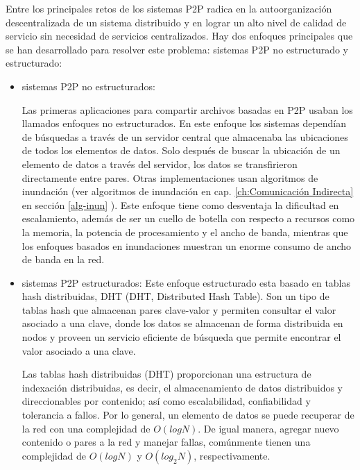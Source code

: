 Entre los principales retos  de los sistemas P2P radica en la autoorganización descentralizada de un sistema distribuido y en lograr un alto nivel de calidad de servicio sin necesidad de servicios centralizados. Hay dos enfoques principales que se han desarrollado para resolver este problema: sistemas P2P no estructurado y estructurado:

\begin{itemize}
	\item sistemas P2P no estructurados:
	
	Las primeras aplicaciones para compartir archivos basadas en P2P   usaban los llamados enfoques no estructurados. En este enfoque los  sistemas dependían de búsquedas a través de un servidor central que almacenaba las ubicaciones de todos los elementos de datos. Solo después de buscar la ubicación de un elemento de datos a través del servidor, los datos se transfirieron directamente entre pares. Otras implementaciones usan algoritmos de  inundación (ver algoritmos de  inundación en cap. \ref{ch:Comunicación Indirecta} en secci\'on \ref{alg-inun} ).
	Este enfoque tiene como desventaja la dificultad en escalamiento, además de ser un cuello de botella con respecto a recursos como la memoria, la potencia de procesamiento y el ancho de banda, mientras que los enfoques basados en inundaciones muestran un enorme consumo de ancho de banda en la red.  
	
	\item sistemas P2P estructurados: 
	Este enfoque estructurado esta basado en \gls{tablas hash distribuidas}, DHT (DHT, Distributed Hash Table).  Son un tipo de tablas hash que almacenan pares  clave-valor y permiten consultar el valor asociado a una clave, donde   los datos se almacenan de forma distribuida en   nodos  y proveen un servicio eficiente de búsqueda que permite encontrar el valor asociado a una clave.
	
    Las tablas hash distribuidas (DHT)    proporcionan una estructura de indexación distribuidas, es decir, el  almacenamiento de datos distribuidos y direccionables por contenido; así como    escalabilidad, confiabilidad y tolerancia a fallos. Por lo general, un elemento de datos se puede recuperar de la red con una complejidad de $O(logN)$. De igual manera,  agregar nuevo contenido o pares a la red  y manejar fallas, 	comúnmente tienen una complejidad de $O(logN)$ y $O(log_{2}N)$, respectivamente.
 
\end{itemize}

